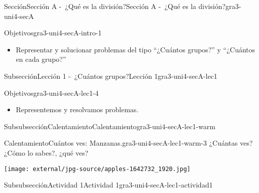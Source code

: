 \documentclass[twoside,10pt,]{article}
\begin{document}
%
%
\typeout{************************************************}
\typeout{************************************************}
%
\begin{sectionptx}{Sección}{Sección A -~¿Qué es la división?}{}{Sección A -~¿Qué es la división?}{}{}{gra3-uni4-secA}
\begin{introduction}{}%
\begin{objectives}{Objetivos}{gra3-uni4-secA-intro-1}
%
\begin{itemize}[label=\textbullet]
\item{}Representar y solucionar problemas del tipo “¿Cuántos grupos?” y “¿Cuántos en cada grupo?”%
\end{itemize}
\end{objectives}
\end{introduction}%
%
%
\typeout{************************************************}
\typeout{************************************************}
%
\begin{subsectionptx}{Subsección}{Lección 1 -~¿Cuántos grupos?}{}{Lección 1}{}{}{gra3-uni4-secA-lec1}
\begin{objectives}{Objetivos}{gra3-uni4-secA-lec1-4}
%
\begin{itemize}[label=\textbullet]
\item{}Representemos y resolvamos problemas.%
\end{itemize}
\end{objectives}
%
%
\typeout{************************************************}
\typeout{************************************************}
%
\begin{subsubsectionptx}{Subsubsección}{Calentamiento}{}{Calentamiento}{}{}{gra3-uni4-secA-lec1-warm}
\begin{exploration}{Calentamiento}{Cuántos ves: Manzanas.}{gra3-uni4-secA-lec1-warm-3}%
¿Cuántas ves? ¿Cómo lo sabes?, ¿qué ves?%
\begin{image}{0}{1}{0}{}%
\texttt{[image: external/jpg-source/apples-1642732\_1920.jpg]}
\end{image}%
\end{exploration}%
\end{subsubsectionptx}
%
%
\typeout{************************************************}
\typeout{************************************************}
%
\begin{subsubsectionptx}{Subsubsección}{Actividad 1}{}{Actividad 1}{}{}{gra3-uni4-secA-lec1-actividad1}

\end{subsubsectionptx}
\end{subsectionptx}
\end{sectionptx}
\end{document}
